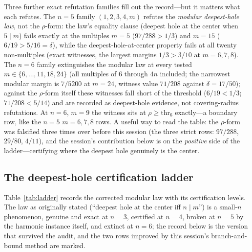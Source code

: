Three further exact refutation families fill out the record---but it
matters what each refutes. The $n=5$ family $(1,2,3,4,m)$ refutes the
\emph{modular deepest-hole law}, not the $\rho$-form: the law's
equality clause (deepest hole at the center when $5\mid m$) fails
exactly at the multiples $m=5$ ($97/288>1/3$) and $m=15$
($6/19>5/16=\delta$), while the deepest-hole-at-center property fails
at all twenty non-multiples (exact witnesses, the largest margins
$1/3>3/10$ at $m=6,7,8$). The $n=6$ family extinguishes the modular law
at every tested $m\in\{6,\dots,11,18,24\}$ (all multiples of $6$
through $4n$ included; the narrowest modular margin is $7/5200$ at
$m=24$, witness value $71/208$ against $\delta=17/50$); against the
$\rho$-form itself these witnesses fall short of the threshold
($6/19<1/3$; $71/208<5/14$) and are recorded as deepest-hole evidence,
not covering-radius refutations. At $n=6$, $m=9$ the witness sits at
$\rho\ge\mathrm{thr}_6$ exactly---a boundary row, like the $n=5$
$m=6,7,8$ rows. A useful way to read the table: the $\rho$-form was
falsified three times over before this session (the three strict rows:
$97/288$, $29/80$, $4/11$), and the session's contribution below is on
the \emph{positive} side of the ladder---certifying where the deepest
hole genuinely is the center.

\subsection{The deepest-hole certification ladder}

Table~\ref{tab:ladder} records the corrected modular law with its
certification levels. The law as originally stated (``deepest hole at
the center iff $n\mid m$'') is a small-$n$ phenomenon, genuine and exact
at $n=3$, certified at $n=4$, broken at $n=5$ by the harmonic instance
itself, and extinct at $n=6$; the record below is the version that
survived the audit, and the two rows improved by this session's
branch-and-bound method are marked.


